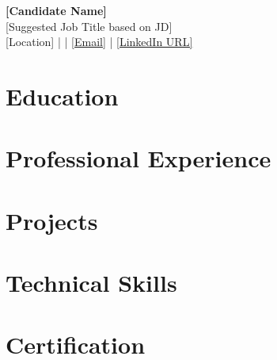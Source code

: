 \documentclass[letterpaper,11pt]{article}
\begin{document}
\begin{center}
  {\LARGE \textbf{[Candidate Name]}}\\
  {\normalsize [Suggested Job Title based on JD]} \\
  \small
  [Location]
  \quad | \quad
  [Phone]
  \quad | \quad
  \href{mailto:[Email]}{[Email]}
  \quad | \quad
  \href{[LinkedIn URL]}{[LinkedIn URL]}
\end{center}
\vspace{-13pt}

\section*{Education}

\section*{Professional Experience}

\section*{Projects}

\section*{Technical Skills}

\section*{Certification}
\end{document}
